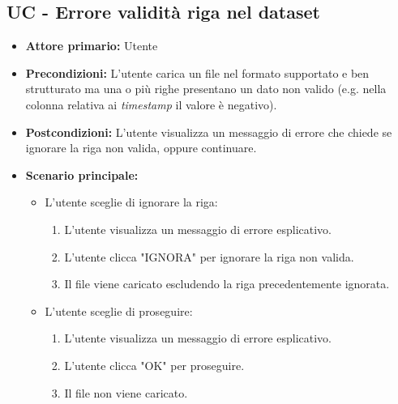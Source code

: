 \subsection{UC - Errore validità riga nel dataset}
\label{sec:UC - Errore validità riga}
\begin{itemize}
    \item \textbf{Attore primario:} Utente
    \item \textbf{Precondizioni:} L'utente carica un file nel formato supportato e ben strutturato ma una o più righe presentano un dato non valido (e.g. nella colonna relativa ai \textit{timestamp} il valore è negativo).  
    \item \textbf{Postcondizioni:} L'utente visualizza un messaggio di errore che chiede se ignorare la riga non valida, oppure continuare.
    \item \textbf{Scenario principale:}
    \begin{itemize}
        \item   L'utente sceglie di ignorare la riga:
                \begin{enumerate}
                    \item L'utente visualizza un messaggio di errore esplicativo.
                    \item L'utente clicca "IGNORA" per ignorare la riga non valida.
                    \item Il file viene caricato escludendo la riga precedentemente ignorata.
                \end{enumerate} 
        \item   L'utente sceglie di proseguire:
                \begin{enumerate}
                    \item L'utente visualizza un messaggio di errore esplicativo.
                    \item L'utente clicca "OK" per proseguire.
                    \item Il file non viene caricato.
                \end{enumerate} 
    \end{itemize}
\end{itemize}

